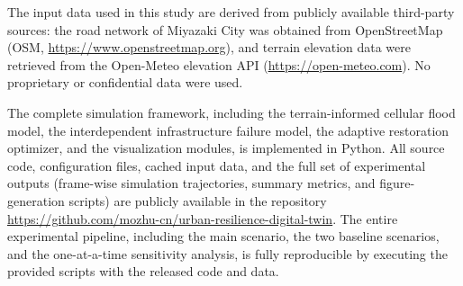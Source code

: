 \documentclass[preprint,12pt]{elsarticle}
\begin{document}
The input data used in this study are derived from publicly available
third-party sources: the road network of Miyazaki City was obtained from
OpenStreetMap (OSM, \url{https://www.openstreetmap.org}), and terrain
elevation data were retrieved from the Open-Meteo elevation API
(\url{https://open-meteo.com}). No proprietary or confidential data were
used.

The complete simulation framework, including the terrain-informed cellular
flood model, the interdependent infrastructure failure model, the adaptive
restoration optimizer, and the visualization modules, is implemented in
Python. All source code, configuration files, cached input data, and the
full set of experimental outputs (frame-wise simulation trajectories,
summary metrics, and figure-generation scripts) are publicly available in
the repository \url{https://github.com/mozhu-cn/urban-resilience-digital-twin}.
The entire experimental pipeline, including the main scenario, the two
baseline scenarios, and the one-at-a-time sensitivity analysis, is fully
reproducible by executing the provided scripts with the released code and
data.



\end{document}
